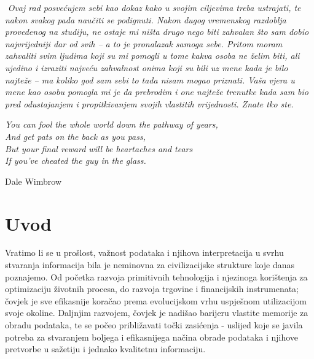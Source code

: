 \documentclass[a4paper,12pt,oneside]{memoir}
\begin{document}
\begin{titlingpage}
            \newpage
                \thispagestyle{empty}
                $ $
                    \vfill
                    \textit{Ovaj rad posvećujem sebi kao dokaz kako u svojim ciljevima treba ustrajati, te nakon svakog pada naučiti se podignuti. Nakon dugog vremenskog razdoblja provedenog na studiju, ne ostaje mi ništa drugo nego biti zahvalan što sam dobio najvrijedniji dar od svih -- a to je pronalazak samoga sebe. Pritom moram zahvaliti svim ljudima koji su mi pomogli u tome kakva osoba ne želim biti, ali ujedino i izraziti najveću zahvalnost onima koji su bili uz mene kada je bilo najteže -- ma koliko god sam sebi to tada nisam mogao priznati. Vaša vjera u mene kao osobu pomogla mi je da prebrodim i one najteže trenutke kada sam bio pred odustajanjem i propitkivanjem svojih vlastitih vrijednosti. Znate tko ste.
                    }
                    \epigraph{\textit{You can fool the whole world down the pathway of years,\\
                    And get pats on the back as you pass,\\
                    But your final reward will be heartaches and tears\\
                    If you've cheated the guy in the glass.}}{Dale Wimbrow}
                    \vfill
    \end{titlingpage}
    \begin{KeepFromToc}
        \tableofcontents
    \end{KeepFromToc}
    \chapter{Uvod}

        Vratimo li se u prošlost, važnost podataka i njihova interpretacija u svrhu stvaranja informacija bila je neminovna za civilizacijske strukture koje danas poznajemo. Od početka razvoja primitivnih tehnologija i njezinoga korištenja za optimizaciju životnih procesa, do razvoja trgovine i financijskih instrumenata; čovjek je sve efikasnije koračao prema evolucijskom vrhu uspješnom utilizacijom svoje okoline. Daljnjim razvojem, čovjek je nadišao barijeru vlastite memorije za obradu podataka, te se počeo približavati točki zasićenja - uslijed koje se javila potreba za stvaranjem boljega i efikasnijega načina obrade podataka i njihove pretvorbe u sažetiju i jednako kvalitetnu informaciju.
\end{document}
